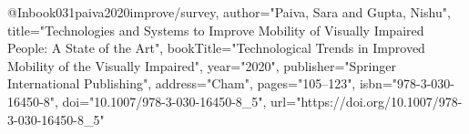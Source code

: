 @Inbook{031paiva2020improve/survey,
author="Paiva, Sara
and Gupta, Nishu",
title="Technologies and Systems to Improve Mobility of Visually Impaired People: A State of the Art",
bookTitle="Technological Trends in Improved Mobility of the Visually Impaired",
year="2020",
publisher="Springer International Publishing",
address="Cham",
pages="105--123",
isbn="978-3-030-16450-8",
doi="10.1007/978-3-030-16450-8_5",
url="https://doi.org/10.1007/978-3-030-16450-8_5"
}